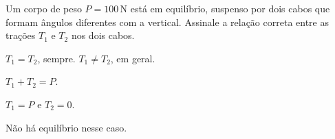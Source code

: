 \documentclass{beamer}
\begin{document}
  {Um corpo de peso $P = 100\,\text{N}$ está em equilíbrio, suspenso por
   dois cabos que formam ângulos diferentes com a vertical. Assinale a
   relação correta entre as trações $T_1$ e $T_2$ nos dois cabos.

   \begin{alternativas}
     \item $T_1 = T_2$, sempre.
     \itemCorreto* $T_1 \neq T_2$, em geral.
     \item $T_1 + T_2 = P$.
     \item $T_1 = P$ e $T_2 = 0$.
     \item Não há equilíbrio nesse caso.
   \end{alternativas}}
  {\IFCEimagemDummy{15.0cm}{13.0cm}}

\gabarito
\end{document}
